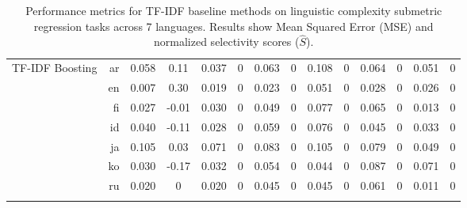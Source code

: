 \documentclass[11pt]{article}
\begin{document}
\begin{table}[H]
{{\begin{tabular}{p{2.5cm}rcccccccccccc}
        \multirow{7}{2.5cm}{\centering\small TF-IDF Boosting} 
        & ar & 0.058 & 0.11 & 0.037 & 0 & 0.063 & 0 & 0.108 & 0 & 0.064 & 0 & 0.051 & 0 \\
        & en & 0.007 & 0.30 & 0.019 & 0 & 0.023 & 0 & 0.051 & 0 & 0.028 & 0 & 0.026 & 0 \\
        & fi & 0.027 & -0.01 & 0.030 & 0 & 0.049 & 0 & 0.077 & 0 & 0.065 & 0 & 0.013 & 0 \\
        & id & 0.040 & -0.11 & 0.028 & 0 & 0.059 & 0 & 0.076 & 0 & 0.045 & 0 & 0.033 & 0 \\
        & ja & 0.105 & 0.03 & 0.071 & 0 & 0.083 & 0 & 0.105 & 0 & 0.079 & 0 & 0.049 & 0 \\
        & ko & 0.030 & -0.17 & 0.032 & 0 & 0.054 & 0 & 0.044 & 0 & 0.087 & 0 & 0.071 & 0 \\
        & ru & 0.020 & 0 & 0.020 & 0 & 0.045 & 0 & 0.045 & 0 & 0.061 & 0 & 0.011 & 0 \\\hhline{*{14}{-}}
        
    \end{tabular}
    }}
\caption{Performance metrics for TF-IDF baseline methods on linguistic complexity submetric regression tasks across 7 languages. Results show Mean Squared Error (MSE) and normalized selectivity scores ($\widehat{S}$).}
\end{table}
\end{document}
